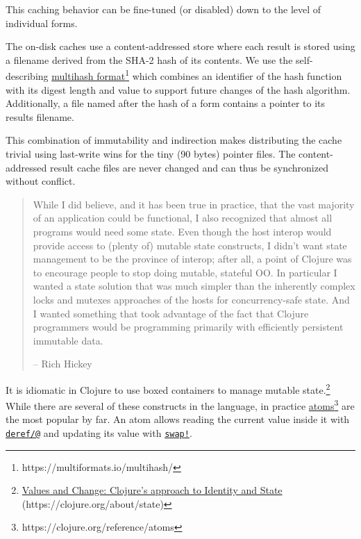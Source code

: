 \documentclass[sigconf,screen,pbalance=true]{acmart}
\newcommand{\passthrough}[1]{#1}
\begin{document}
This caching behavior can be fine-tuned (or disabled) down to the level of individual forms.

The on-disk caches use a content-addressed store where each result is stored using a filename derived from the SHA-2 hash of its contents. We use the self-describing {\href{https://multiformats.io/multihash/}{multihash format}\footnote{https://multiformats.io/multihash/}} which combines an identifier of the hash function with its digest length and value to support future changes of the hash algorithm. Additionally, a file named after the hash of a form contains a pointer to its results filename.

This combination of immutability and indirection makes distributing the cache trivial using last-write wins for the tiny (90 bytes) pointer files. The content-addressed result cache files are never changed and can thus be synchronized without conflict.

\begin{quote}
While I did believe, and it has been true in practice, that the vast majority of an application could be functional, I also recognized that almost all programs would need some state. Even though the host interop would provide access to (plenty of) mutable state constructs, I didn't want state management to be the province of interop; after all, a point of Clojure was to encourage people to stop doing mutable, stateful OO. In particular I wanted a state solution that was much simpler than the inherently complex locks and mutexes approaches of the hosts for concurrency-safe state. And I wanted something that took advantage of the fact that Clojure programmers would be programming primarily with efficiently persistent immutable data. \cite{Hickey_2020}

-- Rich Hickey
\end{quote}

It is idiomatic in Clojure to use boxed containers to manage mutable state.\footnote{{\href{https://clojure.org/about/state}{Values and Change: Clojure's approach to Identity and State} (https://clojure.org/about/state)}} While there are several of these constructs in the language, in practice {\href{https://clojure.org/reference/atoms}{atoms}\footnote{https://clojure.org/reference/atoms}} are the most popular by far. An atom allows reading the current value inside it with {\href{https://clojuredocs.org/clojure.core/deref}{\passthrough{\lstinline!deref/@!}}} and updating it\textquotesingle s value with {\href{https://clojuredocs.org/clojure.core/swap!}{\passthrough{\lstinline"swap!"}}}.
\end{document}
